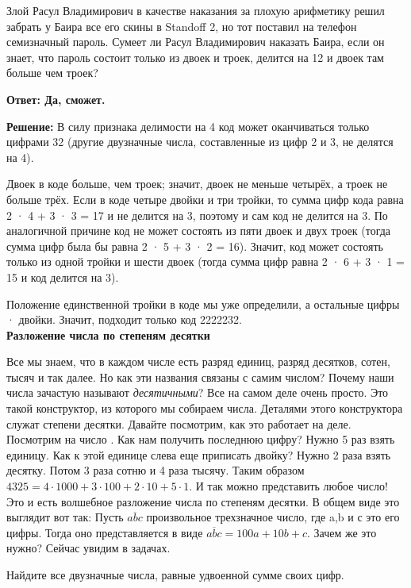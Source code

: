  Злой Расул Владимирович в качестве наказания за плохую арифметику решил забрать у Баира все его скины в Standoff 2, но тот поставил на телефон семизначный пароль. Сумеет ли Расул Владимирович наказать Баира, если он знает, что пароль состоит только из двоек и троек, делится на 12 и двоек там больше чем троек? 

\textbf{Ответ: Да, сможет.}

\textbf{Решение:} В силу признака делимости на 4 код может оканчиваться только цифрами 32 (другие двузначные числа, составленные из цифр 2 и 3, не делятся на 4).

Двоек в коде больше, чем троек; значит, двоек не меньше четырёх, а троек не больше трёх. Если в коде четыре двойки и три тройки, то сумма цифр кода равна 2 · 4 + 3 · 3 = 17 и не делится на 3, поэтому и сам код не делится на 3. По аналогичной причине код не может состоять из пяти двоек и двух троек (тогда сумма цифр была бы равна 2 · 5 + 3 · 2 = 16). Значит, код может состоять только из одной тройки и шести двоек (тогда сумма цифр равна 2 · 6 + 3 · 1 = 15 и код делится на 3).

Положение единственной тройки в коде мы уже определили, а остальные цифры · двойки. Значит, подходит только код 2222232.\\ 

\noindent\textbf{\Large Разложение числа по степеням десятки}

Все мы знаем, что в каждом числе есть разряд единиц, разряд десятков, сотен, тысяч и так далее. Но как эти названия связаны с самим числом? Почему наши числа зачастую называют \textit{десятичными}? Все на самом деле очень просто. Это такой конструктор, из которого мы собираем числа. Деталями этого конструктора служат степени десятки. Давайте посмотрим, как это работает на деле. Посмотрим на число 
\newpage
{}. Как нам получить последнюю цифру? Нужно 5 раз взять единицу. Как к этой единице слева еще приписать двойку? Нужно 2 раза взять десятку. Потом 3 раза сотню и 4 раза тысячу. Таким образом $4325 = 4\cdot1000+3\cdot100+2\cdot10+5\cdot1$. И так можно представить любое число! Это и есть волшебное разложение числа по степеням десятки. В общем виде это выглядит вот так:
Пусть $\overline{abc}$ произвольное трехзначное число, где a,b и с это его цифры. Тогда оно представляется в виде $\overline{abc}=100a+10b+c$. Зачем же это нужно? Сейчас увидим в задачах.

Найдите все двузначные числа, равные удвоенной сумме своих цифр.

